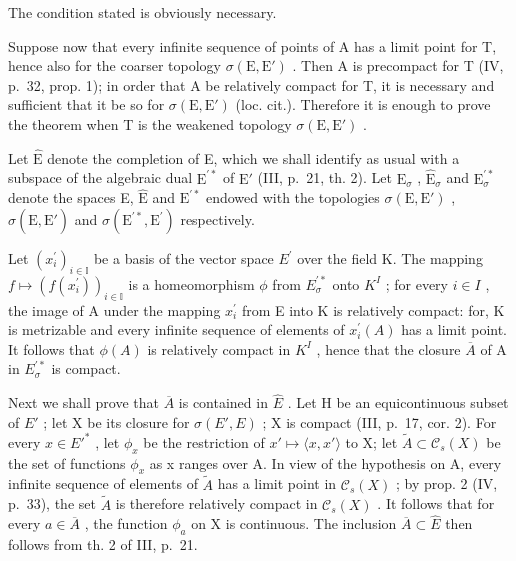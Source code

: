 The condition stated is obviously necessary.

Suppose now that every infinite sequence of points of A has a limit point for T, hence also for the coarser topology \(\sigma(\mathrm{E}, \mathrm{E}')\) . Then A is precompact for T (IV, p.~32, prop. 1); in order that A be relatively compact for T, it is necessary and sufficient that it be so for \(\sigma(\mathrm{E}, \mathrm{E}')\) (loc. cit.). Therefore it is enough to prove the theorem when T is the weakened topology \(\sigma(\mathrm{E}, \mathrm{E}')\) .

Let \(\hat{\mathrm{E}}\) denote the completion of E, which we shall identify as usual with a subspace of the algebraic dual \(\mathrm{E}^{\prime *}\) of \(\mathrm{E}'\) (III, p.~21, th. 2). Let \(\mathrm{E}_{\sigma}\) , \(\hat{\mathrm{E}}_{\sigma}\) and \(\mathrm{E}_{\sigma}^{\prime *}\) denote the spaces E, \(\hat{\mathrm{E}}\) and \(\mathrm{E}^{\prime *}\) endowed with the topologies \(\sigma (\mathrm{E},\mathrm{E}')\) , \(\sigma (\hat{\mathrm{E}},\mathrm{E}')\) and \(\sigma (\mathrm{E}^{\prime *},\mathrm{E}^{\prime})\) respectively.

Let \((x_{i}^{\prime})_{i\in\mathbb{I}}\) be a basis of the vector space \(E^{\prime}\) over the field K. The mapping \(f\mapsto(f(x_{i}^{\prime}))_{i\in\mathbb{I}}\) is a homeomorphism \(\phi\) from \(E_{\sigma}^{\prime*}\) onto \(K^{I}\) ; for every \(i\in I\) , the image of A under the mapping \(x_{i}^{\prime}\) from E into K is relatively compact: for, K is metrizable and every infinite sequence of elements of \(x_{i}^{\prime}(A)\) has a limit point. It follows that \(\phi(A)\) is relatively compact in \(K^{I}\) , hence that the closure \(\overline{A}\) of A in \(E_{\sigma}^{\prime*}\) is compact.

Next we shall prove that \(\overline{A}\) is contained in \(\hat{E}\) . Let H be an equicontinuous subset of \(E'\) ; let X be its closure for \(\sigma(E', E)\) ; X is compact (III, p.~17, cor. 2). For every \(x \in E'^{*}\) , let \(\phi_{x}\) be the restriction of \(x' \mapsto \langle x, x' \rangle\) to X; let \(\tilde{A} \subset \mathcal{C}_{s}(X)\) be the set of functions \(\phi_{x}\) as x ranges over A. In view of the hypothesis on A, every infinite sequence of elements of \(\tilde{A}\) has a limit point in \(\mathcal{C}_{s}(X)\) ; by prop. 2 (IV, p.~33), the set \(\tilde{A}\) is therefore relatively compact in \(\mathcal{C}_{s}(X)\) . It follows that for every \(a \in \overline{A}\) , the function \(\phi_{a}\) on X is continuous. The inclusion \(\overline{A} \subset \hat{E}\) then follows from th. 2 of III, p.~21.

